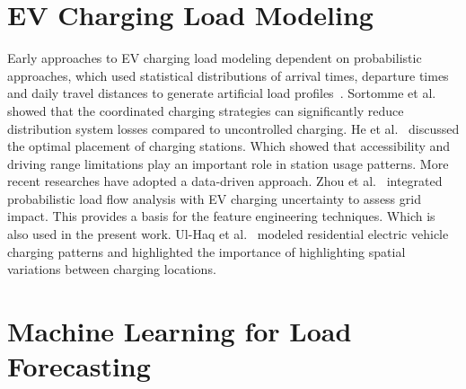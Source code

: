 \documentclass{thesis-library}
\begin{document}
\section{EV Charging Load Modeling}

Early approaches to EV charging load modeling dependent on probabilistic approaches, which used statistical distributions of arrival times,  departure times and daily travel distances to generate artificial  load profiles~\cite{parking_area_ev2022}. 
Sortomme et al.~\cite{peak_load_shaving2021} showed that the coordinated charging strategies can significantly reduce distribution system losses compared to uncontrolled charging.
He et al.~\cite{charging_station_placement2021} discussed the optimal placement of charging stations. Which showed that accessibility and driving range limitations play an important role in station usage patterns.
More recent researches have adopted a data-driven approach.
Zhou et al.~\cite{zhou2019probabilistic} integrated probabilistic load flow analysis with EV charging uncertainty to assess grid impact. This provides a basis for the feature engineering techniques. Which is also used in the present work. Ul-Haq et al.~\cite{parking_area_ev2022} modeled residential electric vehicle charging patterns and highlighted the importance of highlighting spatial variations between charging locations.

\section{Machine Learning for Load Forecasting}
\end{document}
